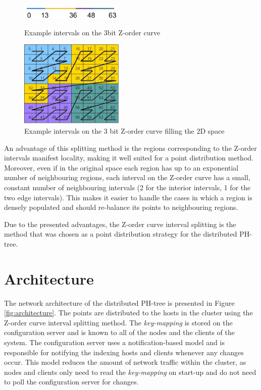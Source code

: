 \documentclass[11pt,a4paper]{globis-book}
\begin{document}
\begin{figure}[t]
    \centering
\parbox{5cm}{
    \includegraphics[width=5cm]{images/zorder-line}
    \caption{Example intervals on the 3bit Z-order curve}
    \label{fig:zorder-line}}
\qquad
\begin{minipage}{5cm}
    \includegraphics[width=5cm]{images/zorder-square}
    \caption{Example intervals on the 3 bit Z-order curve filling the 2D space}
    \label{fig:zorder-square}
\end{minipage}
\end{figure}

An advantage of this splitting method is the regions corresponding to the Z-order intervals manifest locality, making it well suited for a point distribution method. Moreover, even if in the original space each region has up to an exponential number of neighbouring regions, each interval on the Z-order curve has a small, constant number of neighbouring intervals (2 for the interior intervals, 1 for the two edge intervals). This makes it easier to handle the cases in which a region is densely populated and should re-balance its points to neighbouring regions. 

Due to the presented advantages, the Z-order curve interval splitting is the method that was chosen as a point distribution strategy for the distributed PH-tree. 

\section{Architecture}
\label{sec:distindex-architectures}

The network architecture of the distributed PH-tree is presented in Figure \ref{fig:architecture}. The points are distributed to the hosts in the cluster using the Z-order curve interval splitting method. The \textit{key-mapping} is stored on the configuration server and is known to all of the nodes and the clients of the system. The configuration server uses a notification-based model and is responsible for notifying the indexing hosts and clients whenever any changes occur. This model reduces the amount of network traffic within the cluster, as nodes and clients only need to read the \textit{key-mapping} on start-up and do not need to poll the configuration server for changes. 
\end{document}
